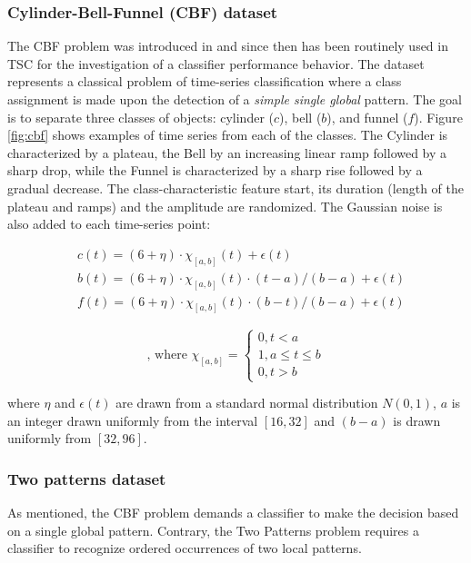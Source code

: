 \subsubsection{Cylinder-Bell-Funnel (CBF) dataset}
The CBF problem was introduced in \cite{cbf} and since then has been routinely used in TSC for the investigation 
of a classifier performance behavior.
The dataset represents a classical problem of time-series classification where a class assignment is made upon the 
detection of a \textit{simple single global} pattern. 
The goal is to separate three classes of objects: cylinder ($c$), bell ($b$), and funnel ($f$).  Figure \ref{fig:cbf} 
shows examples of time series from each of the classes. 
The Cylinder is characterized by a plateau, the Bell by an increasing linear ramp followed by a sharp drop, 
while the Funnel is characterized by a sharp rise followed by a gradual decrease. 
The class-characteristic feature start, its duration (length of the plateau and ramps) and the amplitude are randomized. 
The Gaussian noise is also added to each time-series point:

\noindent\begin{minipage}{.5\linewidth}
\begin{equation*}
\begin{split}
 &c(t)=(6+\eta)\cdot\chi_{[a,b]}(t)+\epsilon(t) \\
 & b(t)=(6+\eta)\cdot\chi_{[a,b]}(t)\cdot(t-a)/(b-a)+\epsilon(t) \\
 & f(t)=(6+\eta)\cdot\chi_{[a,b]}(t)\cdot(b-t)/(b-a)+\epsilon(t)
\end{split}
\end{equation*}
\end{minipage}%
\begin{minipage}{.5\linewidth}
\begin{equation}
\label{eq:cbf}
\text{, where }
\chi_{[a,b]}=\begin{cases}
0,t < a \\
1,a\leq t\leq b\\
0,t > b \end{cases}
\end{equation}
\end{minipage}
\vspace{0.5cm}

where $\eta$ and $\epsilon(t)$ are drawn from a standard normal distribution $N(0,1)$, $a$ is an integer 
drawn uniformly from the interval $[16,32]$ and $(b-a)$ is drawn uniformly from $[32,96]$.

\subsubsection{Two patterns dataset}
As mentioned, the CBF problem demands a classifier to make the decision based on a single global pattern. 
Contrary, the Two Patterns problem requires a classifier to recognize ordered occurrences of two local patterns.

